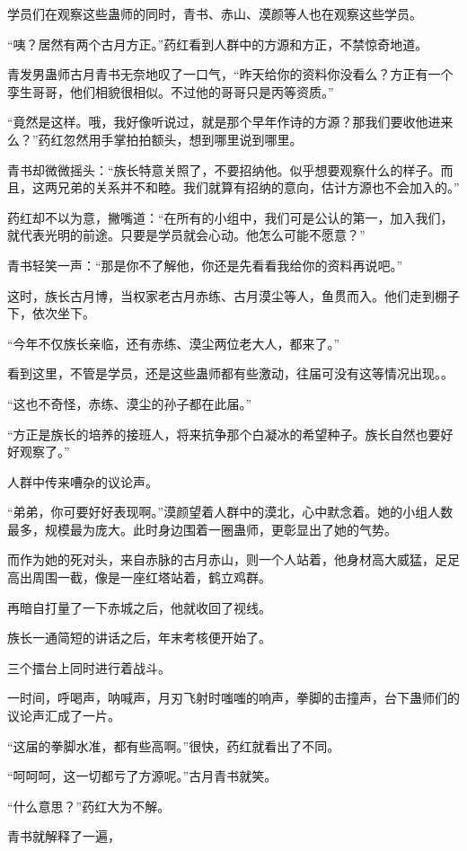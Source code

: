 \begin{this_body}
学员们在观察这些蛊师的同时，青书、赤山、漠颜等人也在观察这些学员。

“咦？居然有两个古月方正。”药红看到人群中的方源和方正，不禁惊奇地道。

青发男蛊师古月青书无奈地叹了一口气，“昨天给你的资料你没看么？方正有一个孪生哥哥，他们相貌很相似。不过他的哥哥只是丙等资质。”

“竟然是这样。哦，我好像听说过，就是那个早年作诗的方源？那我们要收他进来么？”药红忽然用手掌拍拍额头，想到哪里说到哪里。

青书却微微摇头：“族长特意关照了，不要招纳他。似乎想要观察什么的样子。而且，这两兄弟的关系并不和睦。我们就算有招纳的意向，估计方源也不会加入的。”

药红却不以为意，撇嘴道：“在所有的小组中，我们可是公认的第一，加入我们，就代表光明的前途。只要是学员就会心动。他怎么可能不愿意？”

青书轻笑一声：“那是你不了解他，你还是先看看我给你的资料再说吧。”

这时，族长古月博，当权家老古月赤练、古月漠尘等人，鱼贯而入。他们走到棚子下，依次坐下。

“今年不仅族长亲临，还有赤练、漠尘两位老大人，都来了。”

看到这里，不管是学员，还是这些蛊师都有些激动，往届可没有这等情况出现。。

“这也不奇怪，赤练、漠尘的孙子都在此届。”

“方正是族长的培养的接班人，将来抗争那个白凝冰的希望种子。族长自然也要好好观察了。”

人群中传来嘈杂的议论声。

“弟弟，你可要好好表现啊。”漠颜望着人群中的漠北，心中默念着。她的小组人数最多，规模最为庞大。此时身边围着一圈蛊师，更彰显出了她的气势。

而作为她的死对头，来自赤脉的古月赤山，则一个人站着，他身材高大威猛，足足高出周围一截，像是一座红塔站着，鹤立鸡群。

再暗自打量了一下赤城之后，他就收回了视线。

族长一通简短的讲话之后，年末考核便开始了。

三个擂台上同时进行着战斗。

一时间，呼喝声，呐喊声，月刃飞射时嗤嗤的响声，拳脚的击撞声，台下蛊师们的议论声汇成了一片。

“这届的拳脚水准，都有些高啊。”很快，药红就看出了不同。

“呵呵呵，这一切都亏了方源呢。”古月青书就笑。

“什么意思？”药红大为不解。

青书就解释了一遍，


\end{this_body}
